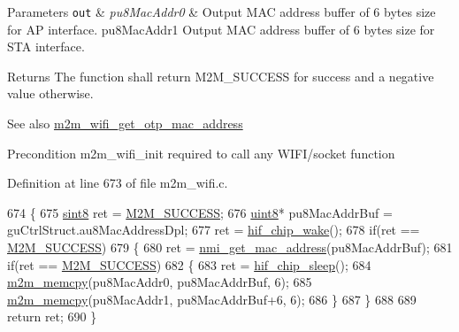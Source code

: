 \begin{DoxyParams}[1]{Parameters}
\mbox{\tt out}  & {\em pu8\+Mac\+Addr0} & Output M\+AC address buffer of 6 bytes size for AP interface. pu8\+Mac\+Addr1 Output M\+AC address buffer of 6 bytes size for S\+TA interface. \\
\hline
\end{DoxyParams}
\begin{DoxyReturn}{Returns}
The function shall return M2\+M\+\_\+\+S\+U\+C\+C\+E\+SS for success and a negative value otherwise. 
\end{DoxyReturn}
\begin{DoxySeeAlso}{See also}
\hyperlink{group__WifiGetOtpMacAddFn_gadb7460d1e0b162decddb7b520e6dbf7b}{m2m\+\_\+wifi\+\_\+get\+\_\+otp\+\_\+mac\+\_\+address} 
\end{DoxySeeAlso}
\begin{DoxyPrecond}{Precondition}
m2m\+\_\+wifi\+\_\+init required to call any W\+I\+F\+I/socket function 
\end{DoxyPrecond}


Definition at line 673 of file m2m\+\_\+wifi.\+c.


\begin{DoxyCode}
674 \{
675     \hyperlink{group__DataT_gae35f10ffd0ac8dd2bc3e794da9bdfbc7}{sint8} ret = \hyperlink{nm__common_8h_a9ef27ba27aafdd1aa3a79d3ba2c36b8f}{M2M\_SUCCESS};
676     \hyperlink{group__DataT_ga4df709a77647e870bbf1d955b8edc9a6}{uint8}* pu8MacAddrBuf = guCtrlStruct.au8MacAddressDpl;
677     ret = \hyperlink{m2m__hif_8c_a88c8f023679d14d6866b80c9275db686}{hif\_chip\_wake}();
678     \textcolor{keywordflow}{if}(ret == \hyperlink{nm__common_8h_a9ef27ba27aafdd1aa3a79d3ba2c36b8f}{M2M\_SUCCESS})
679     \{
680         ret = \hyperlink{nmasic_8c_a8efc5d93ac1e9d1acca8761ce4d8eb97}{nmi\_get\_mac\_address}(pu8MacAddrBuf);
681         \textcolor{keywordflow}{if}(ret == \hyperlink{nm__common_8h_a9ef27ba27aafdd1aa3a79d3ba2c36b8f}{M2M\_SUCCESS})
682         \{
683             ret = \hyperlink{m2m__hif_8c_a41d3f660265e122cbd7417ea8754e8dd}{hif\_chip\_sleep}();
684             \hyperlink{nm__common_8h_a62b30b611dfcc58e190254d1f663470a}{m2m\_memcpy}(pu8MacAddr0, pu8MacAddrBuf, 6);
685             \hyperlink{nm__common_8h_a62b30b611dfcc58e190254d1f663470a}{m2m\_memcpy}(pu8MacAddr1, pu8MacAddrBuf+6, 6);
686         \}
687     \}
688 
689     \textcolor{keywordflow}{return} ret;
690 \}
\end{DoxyCode}
